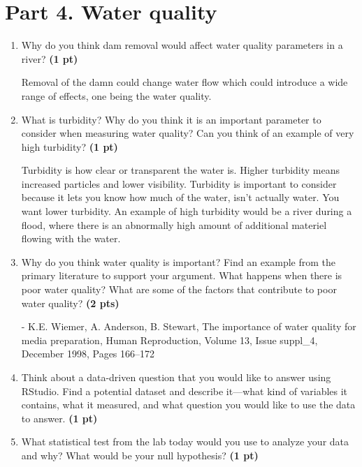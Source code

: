 \documentclass[12pt,letterpaper]{article}
\begin{document}
\section*{Part 4. Water quality}
\begin{enumerate}[font=\bfseries, wide, resume]
    \item Why do you think dam removal would affect water quality parameters in a river? \textbf{(1 pt)}\par

    Removal of the damn could change water flow which could introduce a wide range of effects, one being the water quality. 

    \item What is turbidity? Why do you think it is an important parameter to consider when measuring water quality? Can you think of an example of very high turbidity? \textbf{(1 pt)}\par

    Turbidity is how clear or transparent the water is. Higher turbidity means increased particles and lower visibility. Turbidity is important to consider because it lets you know how much of the water, isn't actually water. You want lower turbidity. An example of high turbidity would be a river during a flood, where there is an abnormally high amount of additional materiel flowing with the water. 

    \item Why do you think water quality is important? Find an example from the primary literature to support your argument. What happens when there is poor water quality? What are some of the factors that contribute to poor water quality? \textbf{(2 pts)}\par



    - K.E. Wiemer, A. Anderson, B. Stewart, The importance of water quality for media preparation, Human Reproduction, Volume 13, Issue suppl\_4, December 1998, Pages 166–172
    
    \item Think about a data-driven question that you would like to answer using RStudio. Find a potential dataset and describe it—what kind of variables it contains, what it measured, and what question you would like to use the data to answer. \textbf{(1 pt)}\par


    \item What statistical test from the lab today would you use to analyze your data and why? What would be your null hypothesis? \textbf{(1 pt)}\par


\end{enumerate}
\end{document}
